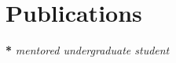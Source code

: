 \section{Publications}
\nocite{*}
\printbibliography[heading=none]
\vspace{-5pt}
\textbf{*} \textit{mentored undergraduate student}









